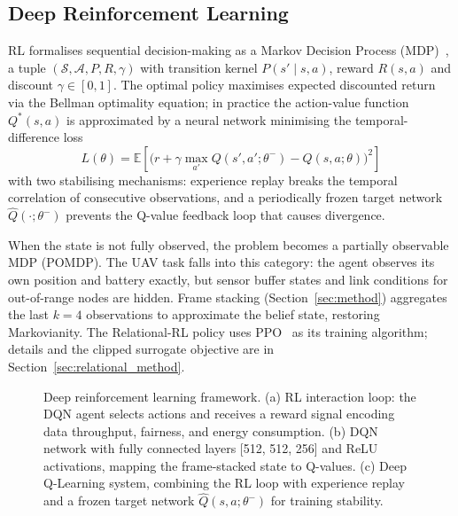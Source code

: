 \subsection{Deep Reinforcement Learning}

RL formalises sequential decision-making as a Markov Decision Process
(MDP)~\cite{luong2019drl}, a tuple $(\mathcal{S}, \mathcal{A}, P, R, \gamma)$
with transition kernel $P(s'\mid s,a)$, reward $R(s,a)$ and discount
$\gamma\in[0,1]$. The optimal policy maximises expected discounted
return via the Bellman optimality equation; in practice the action-value
function $Q^*(s,a)$ is approximated by a neural network minimising the
temporal-difference loss
\begin{equation}
    L(\theta) = \mathbb{E}\!\left[\bigl(r + \gamma\max_{a'} Q(s',a';\theta^-) - Q(s,a;\theta)\bigr)^2\right]
    \label{eq:dqn_loss}
\end{equation}
with two stabilising mechanisms: experience replay breaks the temporal
correlation of consecutive observations, and a periodically frozen target
network $\hat{Q}(\cdot;\theta^-)$ prevents the Q-value feedback loop that
causes divergence.

When the state is not fully observed, the problem becomes a partially observable MDP (POMDP). The UAV task falls into this category: the agent observes its own position and battery exactly, but sensor buffer states and link conditions for out-of-range nodes are hidden. Frame stacking
(Section~\ref{sec:method}) aggregates the last $k = 4$ observations to approximate
the belief state, restoring Markovianity. The Relational-RL policy uses
PPO~\cite{schulman2017ppo} as its training algorithm; details and the clipped
surrogate objective are in Section~\ref{sec:relational_method}.

\begin{figure}[H]
    \centering
    \resizebox{0.95\textwidth}{!}{}
    \caption{Deep reinforcement learning framework. (a) RL interaction
    loop: the DQN agent selects actions and receives a reward signal
    encoding data throughput, fairness, and energy consumption.
    (b) DQN network with fully connected layers [512, 512, 256] and
    ReLU activations, mapping the frame-stacked state to Q-values.
    (c) Deep Q-Learning system, combining the RL loop with experience
    replay and a frozen target network $\hat{Q}(s,a;\theta^-)$ for
    training stability.}
    \label{fig:drl_architecture}
\end{figure}
